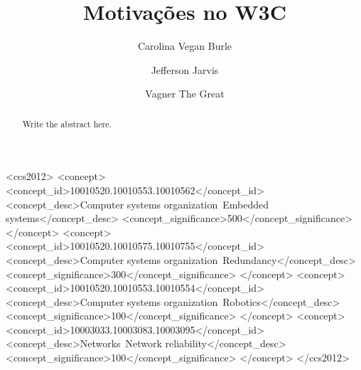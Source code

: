 \documentclass[sigconf]{acmart}
\begin{document}
\title{Motivações no W3C}

\author{Carolina Vegan Burle}

\author{Jefferson Jarvis}

\author{Vagner The Great}



\renewcommand{\shortauthors}{Trovato and Tobin, et al.}

\begin{abstract}
  Write the abstract here.
\end{abstract}

\begin{CCSXML}
<ccs2012>
 <concept>
  <concept_id>10010520.10010553.10010562</concept_id>
  <concept_desc>Computer systems organization~Embedded systems</concept_desc>
  <concept_significance>500</concept_significance>
 </concept>
 <concept>
  <concept_id>10010520.10010575.10010755</concept_id>
  <concept_desc>Computer systems organization~Redundancy</concept_desc>
  <concept_significance>300</concept_significance>
 </concept>
 <concept>
  <concept_id>10010520.10010553.10010554</concept_id>
  <concept_desc>Computer systems organization~Robotics</concept_desc>
  <concept_significance>100</concept_significance>
 </concept>
 <concept>
  <concept_id>10003033.10003083.10003095</concept_id>
  <concept_desc>Networks~Network reliability</concept_desc>
  <concept_significance>100</concept_significance>
 </concept>
</ccs2012>
\end{CCSXML}
\end{document}
